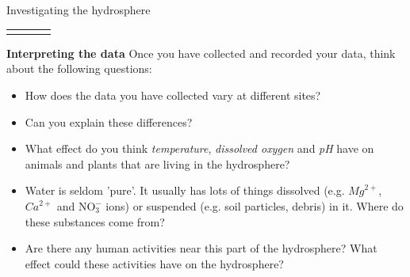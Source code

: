 \begin{Investigation}{Investigating the hydrosphere
      }
\begin{table}[H]
\begin{center}
\begin{xtabular}[t]{|l|l|l|l|}
         &
         &
     \tabularnewline{}
    \end{xtabular}
      \end{center}
\end{table}
    \par
  \label{m38138*uid9}\item \textbf{Interpreting the data}
Once you have collected and recorded your data, think about the following questions:
\label{m38138*id334958}\begin{itemize}[noitemsep]
            \label{m38138*uid10}\item How does the data you have collected vary at different sites?
\label{m38138*uid11}\item Can you explain these differences?
\label{m38138*uid12}\item What effect do you think \textsl{temperature}, \textsl{dissolved oxygen} and \textsl{pH} have on animals and plants that are living in the hydrosphere?
\label{m38138*uid13}\item Water is seldom 'pure'. It usually has lots of things dissolved (e.g. ${Mg}^{2+}$, ${Ca}^{2+}$ and $\mathrm{NO}_{3}^{-}$ ions) or suspended (e.g. soil particles, debris) in it. Where do these substances come from?
\label{m38138*uid14}\item Are there any human activities near this part of the hydrosphere? What effect could these activities have on the hydrosphere?
\end{itemize}
\end{Investigation}
